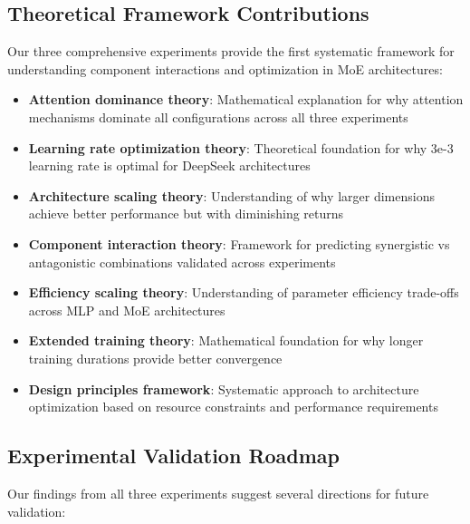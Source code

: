 \documentclass[11pt,a4paper]{article}
\begin{document}
\subsection{Theoretical Framework Contributions}

Our three comprehensive experiments provide the first systematic framework for understanding component interactions and optimization in MoE architectures:

\begin{itemize}
    \item \textbf{Attention dominance theory}: Mathematical explanation for why attention mechanisms dominate all configurations across all three experiments
    \item \textbf{Learning rate optimization theory}: Theoretical foundation for why 3e-3 learning rate is optimal for DeepSeek architectures
    \item \textbf{Architecture scaling theory}: Understanding of why larger dimensions achieve better performance but with diminishing returns
    \item \textbf{Component interaction theory}: Framework for predicting synergistic vs antagonistic combinations validated across experiments
    \item \textbf{Efficiency scaling theory}: Understanding of parameter efficiency trade-offs across MLP and MoE architectures
    \item \textbf{Extended training theory}: Mathematical foundation for why longer training durations provide better convergence
    \item \textbf{Design principles framework}: Systematic approach to architecture optimization based on resource constraints and performance requirements
\end{itemize}

\subsection{Experimental Validation Roadmap}

Our findings from all three experiments suggest several directions for future validation:
\end{document}
